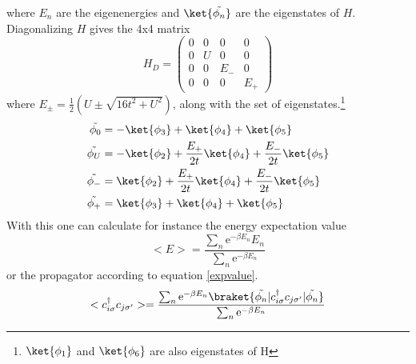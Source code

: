where $E_n$ are the eigenenergies and $\ket{\tilde{\phi_n}}$ are the eigenstates of $H$. Diagonalizing $H$ gives the 4x4 matrix 
\begin{equation*}
H_D=
\begin{pmatrix}
0 & 0 & 0&0\\
0 & U & 0&0\\
0 & 0 & E_{-}&0\\
0 & 0 & 0&E_{+}
\end{pmatrix}
\end{equation*}
where $E_{\pm}=\frac{1}{2}(U\pm\sqrt{16t^2+U^2})$, along with the set of eigenstates.\footnote{$\ket{\phi_1}$ and $\ket{\phi_6}$ are also eigenstates of H}
\begin{align*}
	\tilde{\phi_{0}}&=-\ket{\phi_3}+\ket{\phi_4}+\ket{\phi_5}\\
	\tilde{\phi_{U}}&=-\ket{\phi_2}+\frac{E_+}{2t}\ket{\phi_4}+\frac{E_-}{2t}\ket{\phi_5}	\\
	\tilde{\phi_{-}}&=\ket{\phi_2}+\frac{E_+}{2t}\ket{\phi_4}+\frac{E_-}{2t}\ket{\phi_5}	\\
	\tilde{\phi_{+}}&=\ket{\phi_3}+\ket{\phi_4}+\ket{\phi_5}	
\end{align*}
With this one can calculate for instance the energy expectation value 
\begin{equation}
	<E>  = \frac{\sum_{n}^{}\text{e}^{-\beta E_n}E_n}{\sum_{n}^{}\text{e}^{-\beta E_n}}
\end{equation}
or the propagator according to equation \ref{expvalue}.
\begin{equation}
	<c^{\dagger}_{i\sigma}c_{j\sigma^{\prime}}>= \frac{\sum_{n}^{}\text{e}^{-\beta E_n}\braket{\tilde{\phi_n}|c^{\dagger}_{i\sigma}c_{j\sigma^{\prime}}|\tilde{\phi_n}}}{\sum_{n}^{}\text{e}^{-\beta E_n}}
\end{equation}

